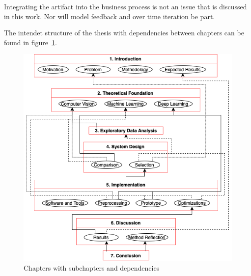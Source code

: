 Integrating the artifact into the business process is not an issue that is discussed in
this work.
Nor will model feedback and over time iteration be part.

The intendet structure of the thesis with dependencies between chapters can be found in
figure~\ref{fig:chapters}.

\begin{figure}[ht]
    \centering
    \includegraphics[width=1.0\textwidth]{img/Chapter.drawio.png}
    \caption{Chapters with subchapters and dependencies\label{fig:chapters}}
\end{figure}
